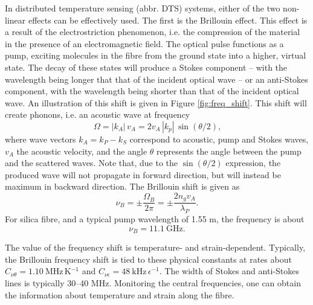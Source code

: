 \documentclass{standalone}
\begin{document}
In distributed temperature sensing (abbr. DTS) systems, either of the two non-linear effects can be effectively used. The first is the Brillouin effect. This effect is a result of the electrostriction phenomenon, i.e. the compression of the material in the presence of an electromagnetic field. The optical pulse functions as a pump, exciting molecules in the fibre from the ground state into a higher, virtual state. The decay of these states will produce a Stokes component -- with the wavelength being longer that that of the incident optical wave -- or an anti-Stokes component, with the wavelength being shorter than that of the incident optical wave. An illustration of this shift is given in Figure \ref{fig:freq_shift}. 
This shift will create phonons, i.e. an acoustic wave at frequency
\begin{equation}
\Omega = \left|k_A\right| \, v_A = 2 v_A \, \left|k_p\right| \, \sin\left(\theta / 2 \right) \textrm{,}
\end{equation}
where wave vectors $k_A = k_P - k_S$ correspond to acoustic, pump and Stokes waves, $v_A$ the acoustic velocity, and the angle $\theta$ represents the angle between the pump and the scattered waves. Note that, due to the $\sin\left(\theta / 2\right)$ expression, the produced wave will not propagate in forward direction, but will instead be maximum in backward direction. The Brillouin shift is given as
\begin{equation}
\nu_B = \pm \frac{\Omega_B}{2 \pi} = \pm \frac{2 n_g v_A}{\lambda_P} \textrm{.}
\end{equation}
For silica fibre, and a typical pump wavelength of 1.55 \textmu m, the frequency is about 
\begin{equation}
\nu_B = \SI{11.1}{\giga \hertz} \textrm{.}
\end{equation}

The value of the frequency shift is temperature- and strain-dependent. Typically, the Brillouin frequency shift is tied to these physical constants at rates about $C_{\nu\theta} = \SI{1.10}{\mega \hertz \, \kelvin^{-1}}$ and $C_{\nu\epsilon} = \SI{48}{\kilo \hertz \, \epsilon^{-1}}$. The width of Stokes and anti-Stokes lines is typically 30--40 MHz. Monitoring the central frequencies, one can obtain the information about temperature and strain along the fibre. \\
\end{document}
